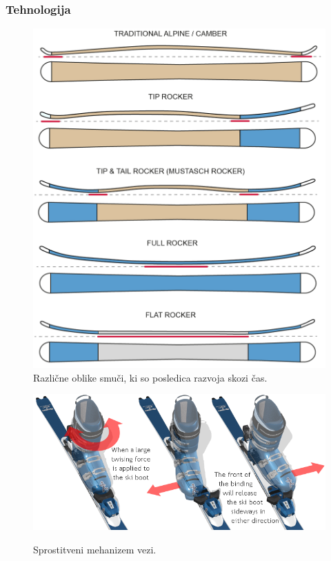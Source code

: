 \documentclass{beamer}
\begin{document}
\begin{frame}
    \frametitle{Tehnologija}
    
    \begin{figure}
        \centering
        \includegraphics[scale=0.07]{../images/rocker profiles.png} \\
        \caption[short]{Različne oblike smuči, ki so posledica razvoja skozi čas.}

        \centering
        \includegraphics[scale=2]{../images/bindings-toe-release.png} \\
        \caption[short]{Sprostitveni mehanizem vezi.}

    \end{figure} 

\end{frame}
\end{document}
